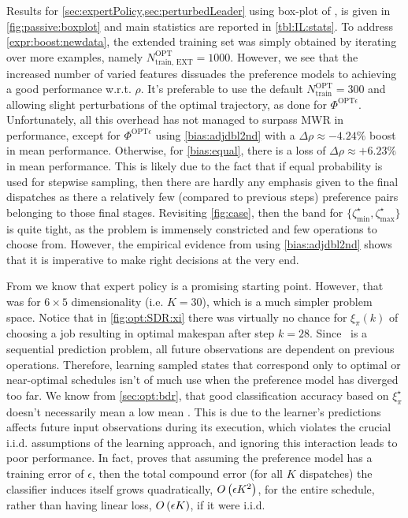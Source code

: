 \documentclass[twocolumn]{svjour3}
\begin{document}
Results for \cref{sec:expertPolicy,sec:perturbedLeader} using  
box-plot of \namerho, is given in \cref{fig:passive:boxplot} and main 
statistics are reported in \cref{tbl:IL:stats}. 
To address \ref{expr:boost:newdata}, the extended training set was simply 
obtained by iterating over more examples, namely $N^{\text{OPT}}_{\text{train, 
EXT}}=1000$. However, we see that the increased number of varied features 
dissuades the preference models to achieving a good performance w.r.t. $\rho$. 
It's preferable to use the default $N^{\text{OPT}}_{\text{train}}=300$ and 
allowing slight perturbations of the optimal trajectory, as done for  
$\Phi^{\text{OPT}\epsilon}$. Unfortunately, all this overhead has not managed 
to surpass MWR in performance, except for $\Phi^{\text{OPT}\epsilon}$ using  \ref{bias:adjdbl2nd} 
with a $\Delta\rho\approx-4.24\%$ boost in mean performance. Otherwise, for 
\ref{bias:equal}, there is a loss of $\Delta\rho\approx+6.23\%$ in mean 
performance. 
This is likely due to the fact that if equal probability is used for stepwise 
sampling, then there are hardly any emphasis given to the final dispatches as 
there a relatively few (compared to previous steps) preference pairs belonging 
to those final stages.
Revisiting \cref{fig:case}, then the band for 
$\{\zeta^{\star}_{\min},\zeta^{\star}_{\max}\}$ is quite tight, as the problem 
is immensely constricted and few operations to choose from. However, the 
empirical evidence from using \ref{bias:adjdbl2nd} shows that it is 
imperative to make right decisions at the very end.

From \cite{InRu11a} we know that expert policy is a promising starting point.
However, that was for $6\times5$ dimensionality (i.e. $K=30$), which is a much 
simpler problem space. Notice that in \cref{fig:opt:SDR:xi} there was 
virtually no chance for $\xi_\pi(k)$ of choosing a job resulting in optimal 
makespan after step $k=28$.
Since \jsp\ is a sequential prediction problem, all future observations are 
dependent on previous operations. 
Therefore, learning sampled states that correspond only to optimal or 
near-optimal schedules isn't of much use when the preference model has 
diverged too far. We know from \cref{sec:opt:bdr}, that good classification 
accuracy based on $\xi^\star_\pi$ doesn't necessarily mean a low mean \namerho.
This is due to the learner's predictions affects future input observations 
during its execution, which violates the crucial i.i.d. assumptions of the  
learning approach, and ignoring this interaction leads to poor performance.
In fact, \cite{RossB10} proves that assuming the preference model has a 
training error of $\epsilon$, then the total compound error (for all $K$ 
dispatches) the classifier induces itself grows quadratically, ${O}\left(\epsilon 
K^2\right)$, for the entire schedule, rather than having linear loss, 
${O}\left(\epsilon K\right)$, if it were i.i.d.
\end{document}
